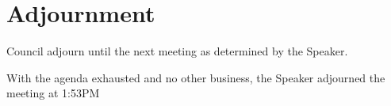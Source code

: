 \documentclass[12pt, letterpaper]{article}
\begin{document}
\hypersetup{} %
\noindent








% 

\section*{Adjournment}

\begin{motion}
    \birt Council adjourn until the next meeting as determined by the Speaker.
    
    With the agenda exhausted and no other business, the Speaker adjourned the
    meeting at 1:53PM
\end{motion}


\end{document}
